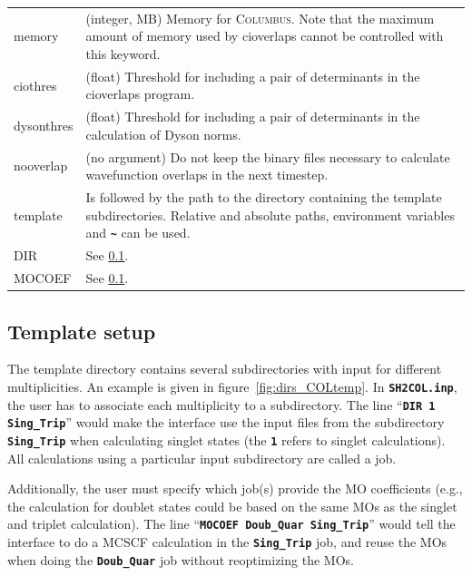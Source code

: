 \documentclass[a4paper,11pt,DIV=15,openany,twoside=false]{scrbook}
\newcommand{\ttt}[1]{\textbf{\texttt{#1}}}
\begin{document}
\begin{tabular}{lp{9cm}}
memory          &(integer, MB) Memory for \textsc{Columbus}. Note that the maximum amount of memory used by cioverlaps cannot be controlled with this keyword.\\
ciothres        &(float) Threshold for including a pair of determinants in the cioverlaps program.\\
dysonthres      &(float) Threshold for including a pair of determinants in the calculation of Dyson norms.\\
nooverlap       &(no argument) Do not keep the binary files necessary to calculate wavefunction overlaps in the next timestep.\\
template        &Is followed by the path to the directory containing the template subdirectories. Relative and absolute paths, environment variables and \ttt{\textasciitilde} can be used.\\
DIR             &See \ref{int:col:template}.\\
MOCOEF          &See \ref{int:col:template}.\\
\end{tabular}

\subsection{Template setup}\label{int:col:template}

The template directory contains several subdirectories with input for different multiplicities. An example is given in figure~\ref{fig:dirs_COLtemp}. In \ttt{SH2COL.inp}, the user has to associate each multiplicity to a subdirectory. The line ``\ttt{DIR 1 Sing\_Trip}'' would make the interface use the input files from the subdirectory \ttt{Sing\_Trip} when calculating singlet states (the \ttt{1} refers to singlet calculations). All calculations using a particular input subdirectory are called a job.

Additionally, the user must specify which job(s) provide the MO coefficients (e.g., the calculation for doublet states could be based on the same MOs as the singlet and triplet calculation). The line ``\ttt{MOCOEF Doub\_Quar Sing\_Trip}'' would tell the interface to do a MCSCF calculation in the \ttt{Sing\_Trip} job, and reuse the MOs when doing the \ttt{Doub\_Quar} job without reoptimizing the MOs.
\end{document}

